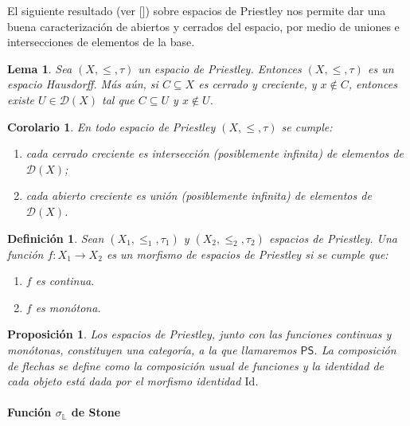 \documentclass[12pt]{book}
\newtheorem{proposition}[theorem]{Proposición}
\newtheorem{lemma}[theorem]{Lema}
\newtheorem{corollary}[theorem]{Corolario}
\newtheorem{definition}[theorem]{Definición}
\newcommand{\Id}{\mathrm{Id}}
\begin{document}
El siguiente resultado (ver  [{\cite[Lema~6.5.1]{SS}}]) sobre espacios de Priestley nos permite dar una buena caracterización de abiertos y cerrados del espacio, por medio de uniones e intersecciones de elementos de la base.

\begin{lemma}\label{lem:Priestley_separacion2}
Sea \( (X,\leq,\tau) \) un espacio de Priestley. Entonces \( (X,\leq,\tau) \) es  un espacio Hausdorff. Más aún, si \( C\subseteq X \) es cerrado y creciente, y \( x\notin C \), entonces existe \( U\in \mathcal{D}(X) \)
tal que \( C\subseteq U \) y \( x\notin U \).
\end{lemma}

\begin{corollary}\label{cor:Priestley_decomp}
En todo espacio de Priestley \( (X,\leq,\tau) \) se cumple:
\begin{enumerate}[\normalfont (1)]
  \item cada cerrado creciente es intersección (posiblemente infinita) de elementos de \( \mathcal{D}(X) \);
  \item cada abierto creciente es unión (posiblemente infinita) de elementos de \( \mathcal{D}(X) \).
\end{enumerate}
\end{corollary}

\begin{definition}\label{def:morfismos_Priestley}
Sean \( (X_{1},\leq_{1},\tau_{1}) \) y \( (X_{2},\leq_{2},\tau_{2}) \) espacios de Priestley.
Una función \( f\colon X_{1}\to X_{2} \) es un \emph{morfismo de espacios de Priestley}
si se cumple que:
\begin{enumerate}
    \item $f$ es continua.
    \item $f$ es monótona.
\end{enumerate}
\end{definition}

\begin{proposition}
Los espacios de Priestley, junto con las funciones continuas y monótonas,
constituyen una categoría, a la que llamaremos \(\mathsf{PS}\).
La composición de flechas se define como la composición usual de funciones
y la identidad de cada objeto está dada por el morfismo identidad \(\Id\).
\end{proposition}



\paragraph{Función $\sigma_\mathbb{L}$ de Stone}\;
\end{document}
